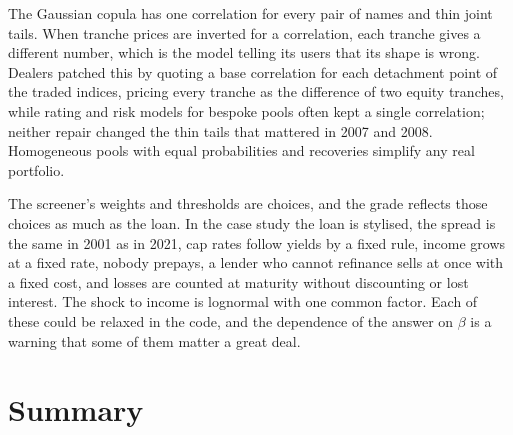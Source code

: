 \begin{chapterrefs}
The Gaussian copula has one correlation for every pair of names and thin joint tails. When tranche
prices are inverted for a correlation, each tranche gives a different number, which is the model
telling its users that its shape is wrong. Dealers patched this by quoting a base correlation for each detachment point
of the traded indices, pricing every tranche as the difference of two equity tranches, while rating and risk models for bespoke pools often kept a single
correlation; neither repair changed the thin tails that mattered in 2007 and 2008. Homogeneous pools with equal probabilities and recoveries
simplify any real portfolio.

The screener's weights and thresholds are choices, and the grade reflects those choices as much as
the loan. In the case study the loan is stylised, the spread is the same in 2001 as in 2021, cap rates
follow yields by a fixed rule, income grows at a fixed rate, nobody prepays, a lender who cannot
refinance sells at once with a fixed cost, and losses are counted at maturity without discounting or
lost interest. The shock to income is lognormal with one common factor. Each of these could be
relaxed in the code, and the dependence of the answer on $\beta$ is a warning that some of them
matter a great deal.

\section{Summary}
\label{sec6:summary}


\end{chapterrefs}
